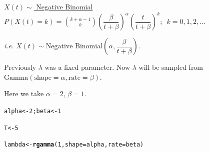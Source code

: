 \documentclass[11pt, a4paper]{article}\usepackage[]{graphicx}\usepackage[]{xcolor}
\makeatletter
\newcommand{\hlnum}[1]{\textcolor[rgb]{0.686,0.059,0.569}{#1}}%
\newcommand{\hldef}[1]{\textcolor[rgb]{0.345,0.345,0.345}{#1}}%
\newcommand{\hlkwb}[1]{\textcolor[rgb]{0.69,0.353,0.396}{#1}}%
\newcommand{\hlkwc}[1]{\textcolor[rgb]{0.333,0.667,0.333}{#1}}%
\newcommand{\hlkwd}[1]{\textcolor[rgb]{0.737,0.353,0.396}{\textbf{#1}}}%
\newenvironment{kframe}{%
 \def\at@end@of@kframe{}%
 \ifinner\ifhmode%
  \def\at@end@of@kframe{\end{minipage}}%
  \begin{minipage}{\columnwidth}%
 \fi\fi%
 \def\FrameCommand##1{\hskip\@totalleftmargin \hskip-\fboxsep
 \colorbox{shadecolor}{##1}\hskip-\fboxsep
     \hskip-\linewidth \hskip-\@totalleftmargin \hskip\columnwidth}%
 \MakeFramed {\advance\hsize-\width
   \@totalleftmargin\z@ \linewidth\hsize
   \@setminipage}}%
 {\par\unskip\endMakeFramed%
 \at@end@of@kframe}
\newenvironment{knitrout}{}{} %
\makeatother
\begin{document}
\faArrowAltCircleRight[regular] \hspace{0.2cm} \underline{$X(t) \sim $ Negative Binomial}\\[1em]

${\displaystyle P(X(t) = k) = \binom{k + \alpha - 1}{k} \left( \dfrac{\beta}{t+\beta} \right)^{\alpha} \left( \dfrac{t}{t+\beta} \right)^k ; \,\,\, k = 0, 1, 2, \ldots}$ \\

\vspace{0.2cm}

\textit{i.e.} $X(t) \sim \text{Negative Binomial}\left( \alpha, \dfrac{\beta}{t + \beta} \right)$. \\

\vspace{0.2cm}

Previously $\lambda$ was a fixed parameter. Now $\lambda$ will be sampled from $\text{Gamma}(\text{shape} = \alpha, \text{rate} = \beta).$

Here we take $\alpha = 2$, $\beta = 1$.

\begin{knitrout}
\color{fgcolor}\begin{kframe}
\begin{alltt}
\hldef{alpha} \hlkwb{<-} \hlnum{2}\hldef{; beta} \hlkwb{<-} \hlnum{1}
\end{alltt}
\end{kframe}
\end{knitrout}

\begin{knitrout}
\color{fgcolor}\begin{kframe}
\begin{alltt}
\hldef{T} \hlkwb{<-} \hlnum{5}

\hldef{lambda} \hlkwb{<-} \hlkwd{rgamma}\hldef{(}\hlnum{1}\hldef{,} \hlkwc{shape} \hldef{= alpha,} \hlkwc{rate} \hldef{= beta)}
\end{alltt}
\end{kframe}
\end{knitrout}
\end{document}

